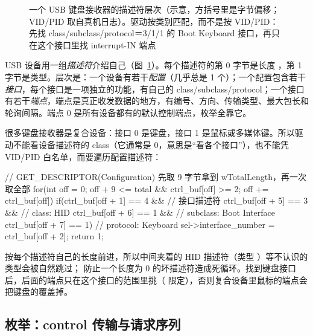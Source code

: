 \begin{figure}[htbp]
  \caption{一个 USB 键盘接收器的描述符层次（示意，方括号里是字节偏移；VID/PID 取自真机日志）。驱动按类别匹配，而不是按 VID/PID：先找 class/subclass/protocol＝3/1/1 的 Boot Keyboard 接口，再只在这个接口里找 interrupt-IN 端点}
  \label{fig:usb-desc}
\end{figure}

USB 设备用一组\emph{描述符}介绍自己（图~\ref{fig:usb-desc}）。每个描述符的第 0 字节是长度 ，第 1 字节是类型。层次是：一个设备有若干\emph{配置}（几乎总是 1 个）；一个配置包含若干\emph{接口}，每个接口是一项独立的功能，有自己的 class/subclass/protocol；一个接口有若干\emph{端点}，端点是真正收发数据的地方，有编号、方向、传输类型、最大包长和轮询间隔。端点 0 是所有设备都有的默认控制端点，枚举全靠它。

很多键盘接收器是复合设备：接口 0 是键盘，接口 1 是鼠标或多媒体键。所以驱动不能看设备描述符的 class（它通常是 0，意思是“看各个接口”），也不能凭 VID/PID 白名单，而要遍历配置描述符：

\begin{ccode}
// GET_DESCRIPTOR(Configuration) 先取 9 字节拿到 wTotalLength，再一次取全部
for(int off = 0; off + 9 <= total && ctrl_buf[off] >= 2; off += ctrl_buf[off]){
  if(ctrl_buf[off + 1] == 4 &&                   // 接口描述符
     ctrl_buf[off + 5] == 3 &&                   // class: HID
     ctrl_buf[off + 6] == 1 &&                   // subclass: Boot Interface
     ctrl_buf[off + 7] == 1){                    // protocol: Keyboard
    sel->interface_number = ctrl_buf[off + 2];
    return 1;
  }
}
\end{ccode}

 按每个描述符自己的长度前进，所以中间夹着的 HID 描述符（类型 ）等不认识的类型会被自然跳过； 防止一个长度为 0 的坏描述符造成死循环。找到键盘接口后，后面的端点只在这个接口的范围里挑（ 限定），否则复合设备里鼠标的端点会把键盘的覆盖掉。

\subsection{枚举：control 传输与请求序列}

